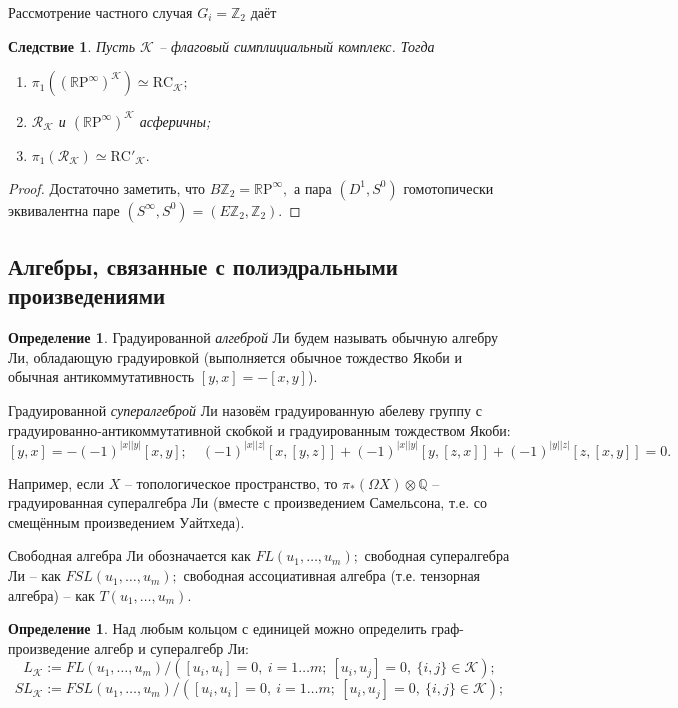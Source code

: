 \documentclass[10pt,a4paper]{article}
\def\ZZ{\mathbb{Z}}
\def\QQ{\mathbb{Q}}
\def\RR{\mathbb{R}}
\def\RC{\mathrm{RC}}
\def\R{\mathcal{R}}
\def\K{\mathcal{K}}
\def\RK{\R_\K}
\def\RCK{\RC_\K}
\newtheorem{crl}[thm]{Следствие}
\theoremstyle{definition}
\newtheorem{dfn}[thm]{Определение}
\begin{document}
Рассмотрение частного случая $G_i=\ZZ_2$ даёт
\begin{crl}
Пусть $\K$ -- флаговый симплициальный комплекс. Тогда
\begin{enumerate}
\item $\pi_1((\RR\mathrm{P}^\infty)^\K)\simeq \RCK;$
\item $\RK$ и $(\RR\mathrm{P}^\infty)^\K$ асферичны;
\item $\pi_1(\RK)\simeq\RC'_\K.$
\end{enumerate}
\end{crl}
\begin{proof}
Достаточно заметить, что $B\ZZ_2=\RR\mathrm{P}^\infty,$ а пара $(D^1,S^0)$ гомотопически эквивалентна паре $(S^\infty,S^0)=(E\ZZ_2,\ZZ_2).$
\end{proof}

\subsection{Алгебры, связанные с полиэдральными произведениями}

\begin{dfn}
Градуированной \emph{алгеброй} Ли будем называть обычную алгебру Ли, обладающую градуировкой (выполняется обычное тождество Якоби и обычная антикоммутативность $[y,x]=-[x,y]$).

Градуированной \emph{супералгеброй} Ли назовём градуированную абелеву группу с градуированно-антикоммутативной скобкой и градуированным тождеством Якоби:
$$[y,x]=-(-1)^{|x||y|}[x,y];\quad (-1)^{|x||z|}[x,[y,z]]+(-1)^{|x||y|}[y,[z,x]]+(-1)^{|y||z|}[z,[x,y]]=0.$$

Например, если $X$ -- топологическое пространство, то $\pi_*(\Omega X)\otimes\QQ$ -- градуированная супералгебра Ли (вместе с произведением Самельсона, т.е. со смещённым произведением Уайтхеда).

Свободная алгебра Ли обозначается как $FL(u_1,\dots,u_m);$ свободная супералгебра Ли -- как $FSL(u_1,\dots,u_m);$ свободная ассоциативная алгебра (т.е. тензорная алгебра) -- как $T(u_1,\dots,u_m).$
\end{dfn}
\begin{dfn}
Над любым кольцом с единицей можно определить граф-произведение алгебр и супералгебр Ли:
$$L_\K := FL(u_1,\dots, u_m)/\left([u_i,u_i]=0,~i=1\dots m;~[u_i,u_j]=0,~\{i,j\}\in\K\right);$$
$$SL_\K := FSL(u_1,\dots, u_m)/\left([u_i,u_i]=0,~i=1\dots m;~[u_i,u_j]=0,~\{i,j\}\in\K\right);$$
\end{dfn}
\end{document}
